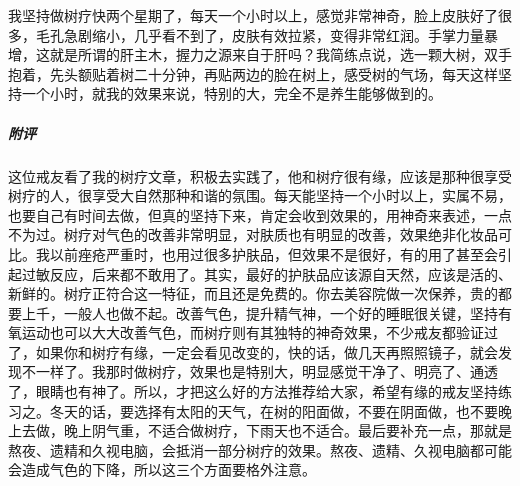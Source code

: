 \begin{case}
    我坚持做树疗快两个星期了，每天一个小时以上，感觉非常神奇，脸上皮肤好了很多，毛孔急剧缩小，几乎看不到了，皮肤有效拉紧，变得非常红润。手掌力量暴增，这就是所谓的肝主木，握力之源来自于肝吗？我简练点说，选一颗大树，双手抱着，先头额贴着树二十分钟，再贴两边的脸在树上，感受树的气场，每天这样坚持一个小时，就我的效果来说，特别的大，完全不是养生能够做到的。
    \subparagraph{附评} 这位戒友看了我的树疗文章，积极去实践了，他和树疗很有缘，应该是那种很享受树疗的人，很享受大自然那种和谐的氛围。每天能坚持一个小时以上，实属不易，也要自己有时间去做，但真的坚持下来，肯定会收到效果的，用神奇来表述，一点不为过。树疗对气色的改善非常明显，对肤质也有明显的改善，效果绝非化妆品可比。我以前痤疮严重时，也用过很多护肤品，但效果不是很好，有的用了甚至会引起过敏反应，后来都不敢用了。其实，最好的护肤品应该源自天然，应该是活的、新鲜的。树疗正符合这一特征，而且还是免费的。你去美容院做一次保养，贵的都要上千，一般人也做不起。改善气色，提升精气神，一个好的睡眠很关键，坚持有氧运动也可以大大改善气色，而树疗则有其独特的神奇效果，不少戒友都验证过了，如果你和树疗有缘，一定会看见改变的，快的话，做几天再照照镜子，就会发现不一样了。我那时做树疗，效果也是特别大，明显感觉干净了、明亮了、通透了，眼睛也有神了。所以，才把这么好的方法推荐给大家，希望有缘的戒友坚持练习之。冬天的话，要选择有太阳的天气，在树的阳面做，不要在阴面做，也不要晚上去做，晚上阴气重，不适合做树疗，下雨天也不适合。最后要补充一点，那就是熬夜、遗精和久视电脑，会抵消一部分树疗的效果。熬夜、遗精、久视电脑都可能会造成气色的下降，所以这三个方面要格外注意。
\end{case}

